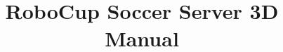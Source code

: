 \documentclass[a4paper,11pt]{scrartcl}
\begin{document}
\title{RoboCup Soccer Server 3D Manual}

\maketitle

\tableofcontents
\clearpage






% 
% 
\end{document}
